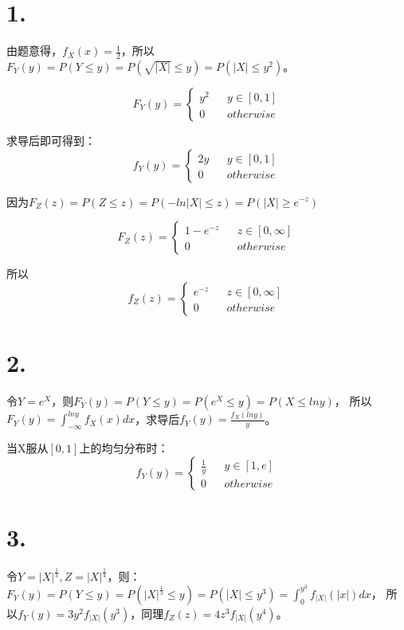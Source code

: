 \documentclass[UTF8]{report}
\begin{document}
    \section*{1.}
        由题意得，$f_X(x) = \frac{1}{2}$，所以
        $F_Y(y) = P(Y \leq y) = P(\sqrt{|X|} \leq y) = P(|X| \leq y^2)$。

        $$F_Y(y) = \left\{
            \begin{array}{lcr}
                y^2 & & y \in [0, 1]\\
                0 & & otherwise
            \end{array}
        \right.$$

        求导后即可得到：
        $$f_Y(y) = \left\{
            \begin{array}{lcr}
                2y & & y \in [0, 1]\\
                0 & & otherwise
            \end{array}
        \right.$$

        因为$F_Z(z) = P(Z \leq z) = P(-ln|X| \leq z) = P(|X| \geq e^{-z})$

        $$F_Z(z) = \left\{
            \begin{array}{lcr}
                1 - e^{-z} & & z \in [0, \infty]\\
                0 & & otherwise
            \end{array}
        \right.$$

        所以
        $$f_Z(z) = \left\{
            \begin{array}{lcr}
                e^{-z} & & z \in [0, \infty]\\
                0 & & otherwise
            \end{array}
        \right.$$
    \section*{2.}
        令$Y = e^X$，则$F_Y(y) = P(Y \leq y) = P(e^X \leq y) = P(X \leq lny)$，
        所以$F_Y(y) = \int_{-\infty}^{lny}f_X(x)dx$，求导后$f_Y(y) = \frac{f_X(lny)}{y}$。

        当X服从$[0, 1]$上的均匀分布时：
        $$f_Y(y) = \left\{
            \begin{array}{lcr}
                \frac{1}{y} & & y \in [1, e]\\
                0 & & otherwise
            \end{array}
        \right.$$
    \section*{3.}
        令$Y = |X|^{\frac{1}{3}}, Z = |X|^{\frac{1}{4}}$，则：
        $F_Y(y) = P(Y \leq y) = P(|X|^{\frac{1}{3}} \leq y) = P(|X| \leq y^3) = \int_{0}^{y^3}f_{|X|}(|x|)dx$，
        所以$f_Y(y) = 3y^2f_{|X|}(y^3)$，同理$f_Z(z) = 4z^3f_{|X|}(y^4)$。
\end{document}
